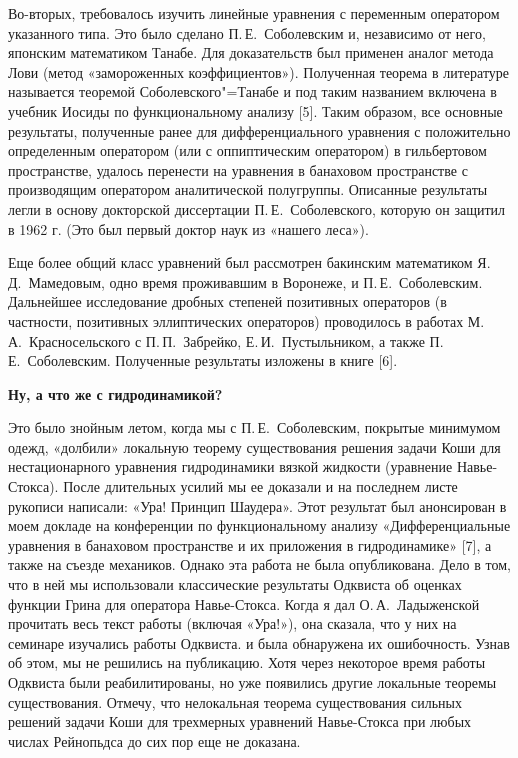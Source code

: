 Во-вторых, требовалось изучить линейные уравнения с переменным оператором указанного типа.
Это было сделано П.\,Е.~Соболевским и, независимо от него, японским математиком Танабе.
Для доказательств был применен аналог метода Лови (метод «замороженных коэффициентов»).
Полученная теорема в литературе называется теоремой Соболевского"=Танабе и под таким названием
включена в учебник Иосиды по функциональному анализу [5].
Таким образом, все основные результаты,
полученные ранее для дифференциального уравнения с положительно определенным оператором (или с оппиптическим оператором)
в гильбертовом пространстве,
удалось перенести на уравнения в банаховом пространстве с производящим оператором аналитической полугруппы. Описанные результаты легли в основу докторской диссертации П.\,Е.~Соболевского, которую он защитил в 1962 г. (Это был первый доктор наук из «нашего леса»).

Еще более общий класс уравнений был рассмотрен бакинским математиком Я.\,Д.~Мамедовым, одно время проживавшим в Воронеже,
и П.\,Е.~Соболевским. Дальнейшее исследование дробных степеней позитивных операторов
(в частности, позитивных эллиптических операторов) проводилось в работах М.\,А.~Красносельского с П.\,П.~Забрейко, Е.\,И.~Пустыльником, а также П.\,Е.~Соболевским. Полученные результаты изложены в книге [6].

{\bf Ну, а что же с гидродинамикой?}

Это было знойным летом, когда мы с П.\,Е.~Соболевским, покрытые минимумом одежд, «долбили» локальную теорему существования решения задачи Коши для нестационарного уравнения гидродинамики вязкой жидкости (уравнение Навье-Стокса). После длительных усилий мы ее доказали и на последнем листе рукописи написали: «Ура! Принцип Шаудера». Этот результат был анонсирован в моем докладе на конференции по функциональному анализу «Дифференциальные уравнения в банаховом пространстве и их приложения в гидродинамике» [7], а также на съезде механиков. Однако эта работа не была опубликована. Дело в том, что в ней мы использовали классические результаты Одквиста об оценках функции Грина для оператора Навье-Стокса. Когда я дал О.\,А.~Ладыженской прочитать весь текст работы (включая «Ура!»), она сказала, что у них на семинаре изучались работы Одквиста. и была обнаружена их ошибочность. Узнав об этом, мы не решились на публикацию. Хотя через некоторое время работы Одквиста были реабилитированы, но уже появились другие локальные теоремы существования. Отмечу, что нелокальная теорема существования сильных решений задачи Коши для трехмерных уравнений Навье-Стокса при любых числах Рейнопьдса до сих пор еще не доказана.

